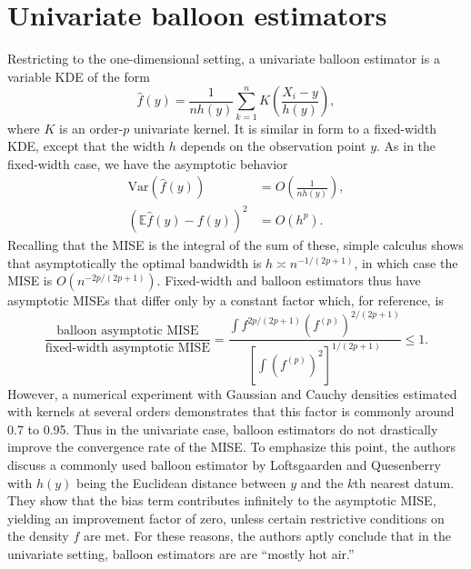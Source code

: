 \documentclass{article}
\newcommand{\E}{\mathbb{E}}
\newcommand{\var}[1]{\text{Var}\left(#1\right)}
\begin{document}
\section{Univariate balloon estimators}
Restricting to the one-dimensional setting, a univariate balloon estimator is a variable KDE of the form 
\begin{equation}\label{eq:balloon1}
    \hat{f}(y) = \frac{1}{nh(y)} \sum_{k=1}^n K\left(\frac{X_i-y}{h(y)}\right), 
\end{equation}
where $K$ is an order-$p$ univariate kernel. It is similar in form to a fixed-width KDE, except that the width $h$ depends on the observation point $y$. As in the fixed-width case, we have the asymptotic behavior
\begin{align}
    \var{\hat{f}(y)} &= O\left(\frac{1}{nh(y)}\right), \label{eq:ub-var} \\
    \left( \E \hat{f}(y) - f(y) \right)^2 &= O\left(h^p\right). \label{eq:ub-bias}
\end{align}
Recalling that the MISE is the integral of the sum of these, simple calculus shows that asymptotically the optimal bandwidth is $h \asymp n^{-1/(2p+1)}$, in which case the MISE is $O\left(n^{-2p/(2p+1)}\right)$. Fixed-width and balloon estimators thus have asymptotic MISEs that differ only by a constant factor which, for reference, is 
\begin{equation}\label{eq:ub-compare}
    \frac{\text{balloon asymptotic MISE}}{\text{fixed-width asymptotic MISE}} = \dfrac{\displaystyle\int f^{2p/(2p+1)} (f^{(p)})^{2/(2p+1)}}{\left[ \displaystyle\int (f^{(p)})^2 \right]^{1/(2p+1)}} \leq 1. 
\end{equation}
 However, a numerical experiment with Gaussian and Cauchy densities estimated with kernels at several orders demonstrates that this factor is commonly around 0.7 to 0.95. Thus in the univariate case, balloon estimators do not drastically improve the convergence rate of the MISE. To emphasize this point, the authors discuss a commonly used balloon estimator by Loftsgaarden and Quesenberry with $h(y)$ being the Euclidean distance between $y$ and the $k$th nearest datum. They show that the bias term contributes infinitely to the asymptotic MISE, yielding an improvement factor of zero, unless certain restrictive conditions on the density $f$ are met. For these reasons, the authors aptly conclude that in the univariate setting, balloon estimators are are ``mostly hot air.''
\end{document}

